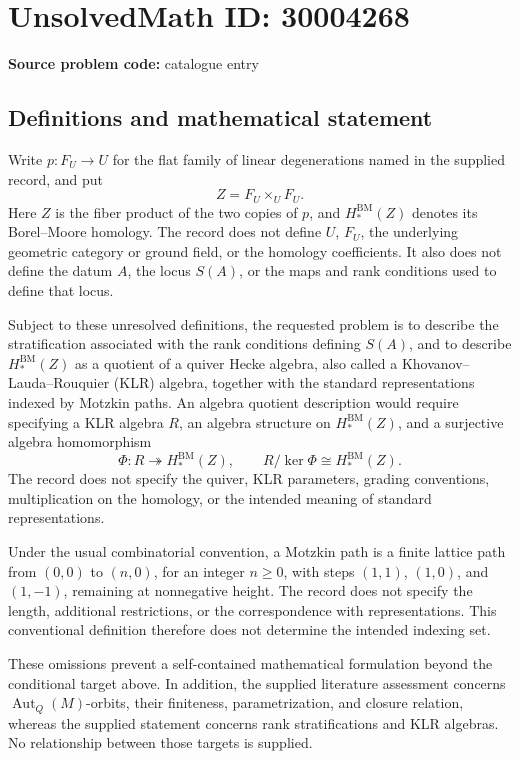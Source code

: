 \documentclass[11pt]{article}
\begin{document}
\section*{UnsolvedMath ID: 30004268}
\textbf{Source problem code:} catalogue entry
\subsection{Definitions and mathematical statement}
Write \(p:F_U\to U\) for the flat family of linear degenerations named in the supplied record, and put
\[
Z=F_U\times_U F_U.
\]
Here \(Z\) is the fiber product of the two copies of \(p\), and \(H_*^{\mathrm{BM}}(Z)\) denotes its Borel--Moore homology. The record does not define \(U\), \(F_U\), the underlying geometric category or ground field, or the homology coefficients. It also does not define the datum \(A\), the locus \(S(A)\), or the maps and rank conditions used to define that locus.

Subject to these unresolved definitions, the requested problem is to describe the stratification associated with the rank conditions defining \(S(A)\), and to describe \(H_*^{\mathrm{BM}}(Z)\) as a quotient of a quiver Hecke algebra, also called a Khovanov--Lauda--Rouquier (KLR) algebra, together with the standard representations indexed by Motzkin paths. An algebra quotient description would require specifying a KLR algebra \(R\), an algebra structure on \(H_*^{\mathrm{BM}}(Z)\), and a surjective algebra homomorphism
\[
\Phi:R\twoheadrightarrow H_*^{\mathrm{BM}}(Z),
\qquad
R/\ker\Phi\cong H_*^{\mathrm{BM}}(Z).
\]
The record does not specify the quiver, KLR parameters, grading conventions, multiplication on the homology, or the intended meaning of standard representations.

Under the usual combinatorial convention, a Motzkin path is a finite lattice path from \((0,0)\) to \((n,0)\), for an integer \(n\geq 0\), with steps \((1,1)\), \((1,0)\), and \((1,-1)\), remaining at nonnegative height. The record does not specify the length, additional restrictions, or the correspondence with representations. This conventional definition therefore does not determine the intended indexing set.

These omissions prevent a self-contained mathematical formulation beyond the conditional target above. In addition, the supplied literature assessment concerns \(\operatorname{Aut}_Q(M)\)-orbits, their finiteness, parametrization, and closure relation, whereas the supplied statement concerns rank stratifications and KLR algebras. No relationship between those targets is supplied.
\end{document}
